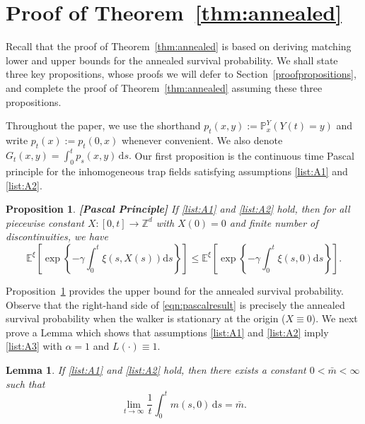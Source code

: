 \documentclass{article}[12pt]
\newtheorem{lemma}{Lemma}[section]
\newtheorem{proposition}{Proposition}[section]
\theoremstyle{definition}
\newcommand{\Z}{\mathbb{Z}}
\newcommand{\pr}{\mathbb{P}}
\newcommand{\1}{\mathbbm{1}}
\newcommand{\dd }{\mathrm{d} }
\begin{document}
\section{Proof of Theorem~\ref{thm:annealed}}
\label{annealed}
Recall that the proof of Theorem~\ref{thm:annealed} is based on deriving matching lower and upper bounds for the annealed survival probability. We shall state three key propositions, whose proofs we will defer to Section~\ref{proofpropositions}, and complete the proof of Theorem~\ref{thm:annealed} assuming these three propositions. 

Throughout the paper, we use the shorthand $ p_t(x,y):=\pr_x^Y(Y(t)=y)$
and write $p_t(x):=p_t(0,x)$ whenever convenient. We also denote $G_t(x,y) = \int_0^t p_s(x,y) \, \dd s.$ Our first proposition is the continuous time Pascal principle for the inhomogeneous trap fields satisfying assumptions \ref{list:A1} and \ref{list:A2}.
\begin{proposition}\label{prop:pascal}{\em \bf[Pascal Principle]}
 If {\rm\ref{list:A1}} and {\ref{list:A2}} hold,
then for all piecewise constant $X:[0,t]\to \Z^d$ with $X(0)=0$ and finite number of discontinuities, we have
  \begin{equation}
   \mathbb{E}^{\xi} \left[ \exp \left\{ - \gamma \int_0^t \xi (s, X (s))
    \text{d} s \right\} \right] \leq \mathbb{E}^{\xi} \left[ \exp \left\{ -
    \gamma \int_0^t \xi (s, 0) \text{d}s \right\} \right]. \label{eqn:pascalresult}
  \end{equation}
\end{proposition} 
Proposition~\ref{prop:pascal} provides the upper bound for the annealed survival probability. Observe  that the right-hand side of \eqref{eqn:pascalresult} is precisely the annealed survival probability when the walker is stationary at the origin ($X\equiv 0$). We next prove a Lemma which shows that assumptions \ref{list:A1} and \ref{list:A2} imply \ref{list:A3} with $\alpha = 1$ and $L(\cdot)\equiv 1$. 
\begin{lemma}\label{lm:alpha1}
   If {\rm\ref{list:A1}} and {\rm \ref{list:A2}} hold, then there exists a constant $0< \bar{m}< \infty$ such that 
    $$\lim_{t\to \infty}\frac{1}{t}\int_0^t m(s,0)\, \dd s = \bar{m}.$$
\end{lemma}
\end{document}
